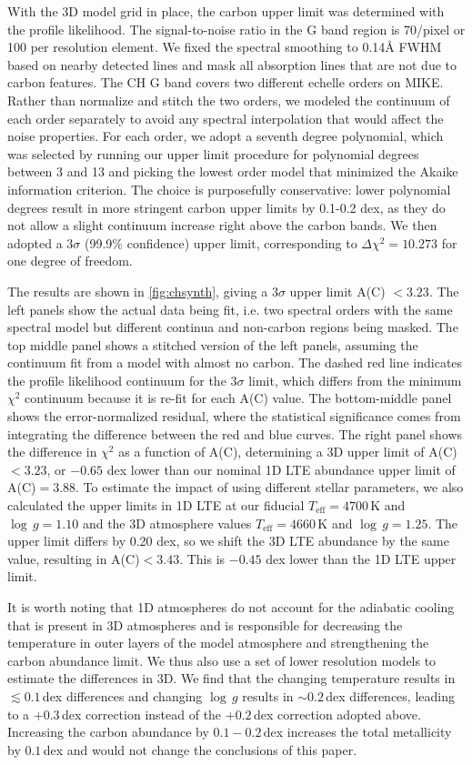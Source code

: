 \documentclass{natureprintstyle}
\newcommand{\teff}{\ensuremath{T_\mathrm{eff}}\xspace}
\newcommand{\Teff}{\teff}
\newcommand{\logg}{\ensuremath{\log\,g}\xspace}
\begin{document}
With the 3D model grid in place, the carbon upper limit was determined with the profile likelihood.
The signal-to-noise ratio in the G band region is 70/pixel or 100 per resolution element.
We fixed the spectral smoothing to 0.14{\AA} FWHM based on nearby detected lines and mask all absorption lines that are not due to carbon features.
The CH G band covers two different echelle orders on MIKE. Rather than normalize and stitch the two orders, we modeled the continuum of each order separately to avoid any spectral interpolation that would affect the noise properties. For each order, we adopt a seventh degree polynomial, which was selected by running our upper limit procedure for polynomial degrees between 3 and 13 and picking the lowest order model that minimized the Akaike information criterion\cite{Akaike1976}. The choice is purposefully conservative: lower polynomial degrees result in more stringent carbon upper limits by 0.1-0.2 dex, as they do not allow a slight continuum increase right above the carbon bands.
We then adopted a $3\sigma$ (99.9\% confidence) upper limit, corresponding to $\Delta \chi^2 = 10.273$ for one degree of freedom.

The results are shown in \ref{fig:chsynth}, giving a $3\sigma$ upper limit A(C) $< 3.23$.
The left panels show the actual data being fit, i.e. two spectral orders with the same spectral model but different continua and non-carbon regions being masked. The top middle panel shows a stitched version of the left panels, assuming the continuum fit from a model with almost no carbon. The dashed red line indicates the profile likelihood continuum for the $3\sigma$ limit, which differs from the minimum $\chi^2$ continuum because it is re-fit for each A(C) value.
The bottom-middle panel shows the error-normalized residual, where the statistical significance comes from integrating the difference between the red and blue curves. The right panel shows the difference in $\chi^2$ as a function of A(C), determining a 3D upper limit of A(C)$<3.23$, or $-0.65$ dex lower than our nominal 1D LTE abundance upper limit of A(C)$=3.88$.
To estimate the impact of using different stellar parameters, we also calculated the upper limits in 1D LTE at our fiducial $\Teff=4700$\,K and $\logg=1.10$ and the 3D atmosphere values $\Teff=4660$\,K and $\logg=1.25$. The upper limit differs by 0.20 dex, so we shift the 3D LTE abundance by the same value, resulting in A(C)$ < 3.43$. This is $-0.45$ dex lower than the 1D LTE upper limit.

It is worth noting that 1D atmospheres do not account for the adiabatic cooling that is present in 3D atmospheres and is responsible for decreasing the temperature in outer layers of the model atmosphere\cite{Asplund1999} and strengthening the carbon abundance limit\cite{Eitner2024,Caffau2024}. We thus also use a set of lower resolution models to estimate the differences in 3D.
We find that the changing temperature results in ${\lesssim}0.1\,$dex differences and changing $\logg$ results in ${\sim}0.2\,$dex differences, leading to a $+0.3\,$dex correction instead of the $+0.2\,$dex correction adopted above. Increasing the carbon abundance by $0.1-0.2\,$dex increases the total metallicity by $0.1\,$dex and would not change the conclusions of this paper.
\end{document}
